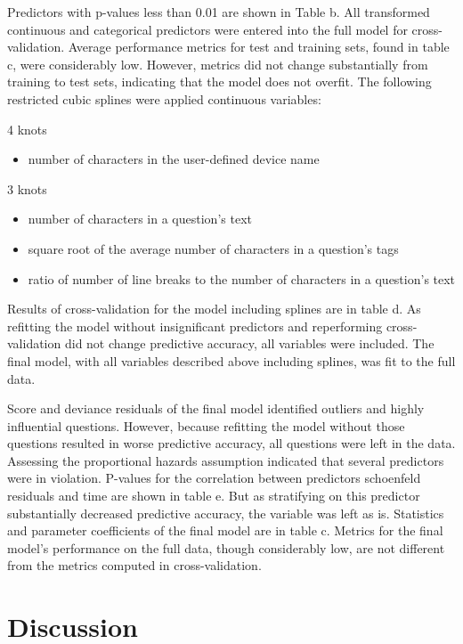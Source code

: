 \documentclass[12pt]{article}
\begin{document}
Predictors with p-values less than 0.01 are shown in Table b. All transformed continuous and categorical predictors were entered into the full model for cross-validation. Average performance metrics for test and training sets, found in table c, were considerably low. However, metrics did not change substantially from training to test sets, indicating that the model does not overfit. The following restricted cubic splines were applied continuous variables:

4 knots
\begin{itemize}
  \item number of characters in the user-defined device name
\end{itemize}

3 knots
\begin{itemize}
  \item number of characters in a question's text
  \item square root of the average number of characters in a question's tags
  \item ratio of number of line breaks to the number of characters in a question's text
\end{itemize}

Results of cross-validation for the model including splines are in table d. As refitting the model without insignificant predictors and reperforming cross-validation did not change predictive accuracy, all variables were included. The final model, with all variables described above including splines, was fit to the full data.  

Score and deviance residuals of the final model identified outliers and highly influential questions. However, because refitting the model without those questions resulted in worse predictive accuracy, all questions were left in the data. Assessing the proportional hazards assumption indicated that several predictors were in violation. P-values for the correlation between predictors schoenfeld residuals and time are shown in table e. But as stratifying on this predictor substantially decreased predictive accuracy, the variable was left as is. Statistics and parameter coefficients of the final model are in table c. Metrics for the final model's performance on the full data, though considerably low, are not different from the metrics computed in cross-validation. 

\section{Discussion}
\end{document}
